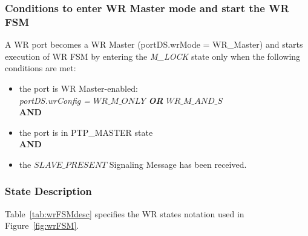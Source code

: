 \documentclass[a4paper, 12pt]{article}
\makeatletter
\renewcommand\paragraph{\@startsection{paragraph}{4}{\z@}%
                                     {-3.25ex\@plus -1ex \@minus -.2ex}%
                                     {0.0001pt \@plus .2ex}%
                                     {\normalfont\normalsize\bfseries}}
\makeatother
\begin{document}
\newpage

\subsubsection{Conditions to enter WR Master mode and start the WR FSM}
\label{sec:wrMasterFSMstart}

A WR port becomes a WR Master (portDS.wrMode = WR\_Master) and starts execution of WR FSM
by entering the \textit{M\_LOCK} state only when the following conditions are met:
\begin{itemize}
\item the port is WR Master-enabled:\\
      \textit{portDS.wrConfig = $WR\_M\_ONLY$ \textbf{OR} $WR\_M\_AND\_S$} \\ 
      \textbf{AND}
\item the port is in PTP\_MASTER state \\
      \textbf{AND}
\item the $SLAVE\_PRESENT$ Signaling Message has been received. 
\end{itemize}




\subsubsection{State Description}

Table~\ref{tab:wrFSMdesc} specifies the WR states notation used in Figure~\ref{fig:wrFSM}.

\newpage
\end{document}
